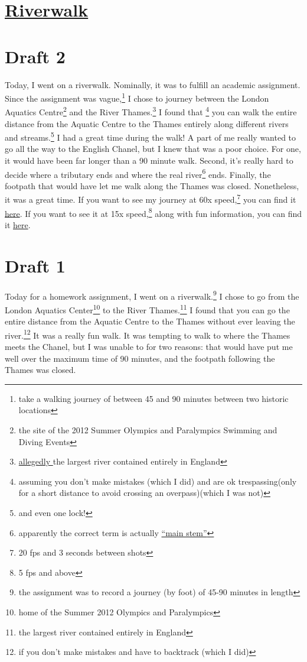 \documentclass[12pt]{article}[titlepage]
\newcommand{\say}[1]{``#1''}
\newcommand{\1}{\={a}}
\newcommand{\2}{\={e}}
\newcommand{\3}{\={\i}}
\newcommand{\4}{\=o}
\newcommand{\5}{\=u}
\newcommand{\6}{\={A}}
\renewcommand{\,}{\textsuperscript{,}}
\begin{document}
\doublespacing

\section{\href{riverwalk.html}{Riverwalk}}
\section{Draft 2}
Today, I went on a riverwalk.
Nominally, it was to fulfill an academic assignment.
Since the assignment was vague,\footnote{take a walking journey of between 45 and 90 minutes between two historic locations} I chose to journey between the London Aquatics Centre\footnote{the site of the 2012 Summer Olympics and Paralympics Swimming and Diving Events} and the River Thames.\footnote{\href{https://en.wikipedia.org/wiki/River_Thames}{allegedly }the largest river contained entirely in England}
I found that
\footnote{assuming you don't make mistakes (which I did) and are ok trespassing(only for a short distance to avoid crossing an overpass)(which I was not)} you can walk the entire distance from the Aquatic Centre to the Thames entirely along different rivers and streams.\footnote{and even one lock!}
I had a great time during the walk!
A part of me really wanted to go all the way to the English Chanel, but I knew that was a poor choice.
For one, it would have been far longer than a 90 minute walk.
Second, it's really hard to decide where a tributary ends and where the real river\footnote{apparently the correct term is actually \href{https://en.wikipedia.org/wiki/Main_stem}{\say{main stem}}} ends.
Finally, the footpath that would have let me walk along the Thames was closed.
Nonetheless, it was a great time.
If you want to see my journey at 60x speed,\footnote{20 fps and 3 seconds between shots} you can find it \href{https://vimeo.com/288755224}{here}.
If you want to see it at 15x speed,\footnote{5 fps and above} along with fun information, you can find it \href{https://www.youtube.com/watch?v=z1j-zlVfoHo}{here}.

\section{Draft 1}
Today for a homework assignment, I went on a riverwalk.\footnote{the assignment was to record a journey (by foot) of 45-90 minutes in length}
I chose to go from the London Aquatics Center\footnote{home of the Summer 2012 Olympics and Paralympics} to the River Thames.\footnote{the largest river contained entirely in England}
I found that you can go the entire distance from the Aquatic Centre to the Thames without ever leaving the river.\footnote{if you don't make mistakes and have to backtrack (which I did)}
It was a really fun walk.
It was tempting to walk to where the Thames meets the Chanel, but I was unable to for two reasons: that would have put me well over the maximum time of 90 minutes, and the footpath following the Thames was closed.
\end{document}
